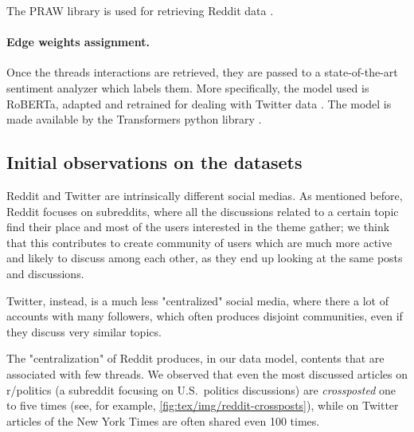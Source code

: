 The PRAW library is used for retrieving Reddit data \cite{praw}.

\paragraph{Edge weights assignment.}%
\label{par:assigning_edge_weights}

Once the threads interactions are retrieved, they are passed to a state-of-the-art
sentiment analyzer which labels them. More specifically, the model used is
RoBERTa, adapted and retrained for dealing with Twitter
data \cite{Barbieri2020}. The model is made available by the Transformers
python library \cite{wolf-etal-2020-transformers}.

%

\subsection{Initial observations on the datasets}%
\label{sub:some_observations_on_the_datasets}

Reddit and Twitter are intrinsically different social medias. As mentioned
before, Reddit focuses on subreddits, where all the discussions related to a
certain topic find their place and most of the users interested in the
theme gather; we think that this contributes to create community of users which are much more
active and likely to discuss among each other, as they end up looking at the
same posts and discussions.

Twitter, instead, is a much less "centralized" social media, where there a lot
of accounts with many followers, which often produces disjoint communities,
even if they discuss very similar topics.

The "centralization" of Reddit produces, in our data model, contents that are
associated with few threads. We observed that even the most discussed articles
on r/politics (a subreddit focusing on U.S.\ politics discussions) are
\emph{crossposted} one to five times (see, for example,
\autoref{fig:tex/img/reddit-crossposts}), while on Twitter articles of the New York Times are
often shared even 100 times.

